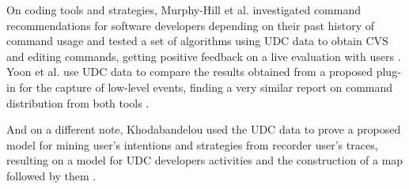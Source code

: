 \documentclass[times]{smrauth}
\begin{document}
On coding tools and strategies, Murphy-Hill et al. investigated command recommendations for software developers depending on their past history of command usage and tested a set of algorithms using UDC data to obtain CVS and editing commands, getting positive feedback on a live evaluation with users \cite{MJM12}. Yoon et al. use UDC data to compare the results obtained from a proposed plug-in for the capture of low-level events, finding a very similar report on command distribution from both tools \cite{YM11}.

And on a different note, Khodabandelou used the UDC data to prove a proposed model for mining user's intentions and strategies from recorder user's traces, resulting on a model for UDC developers activities and the construction of a map followed by them \cite{KG14}.


\end{document}
